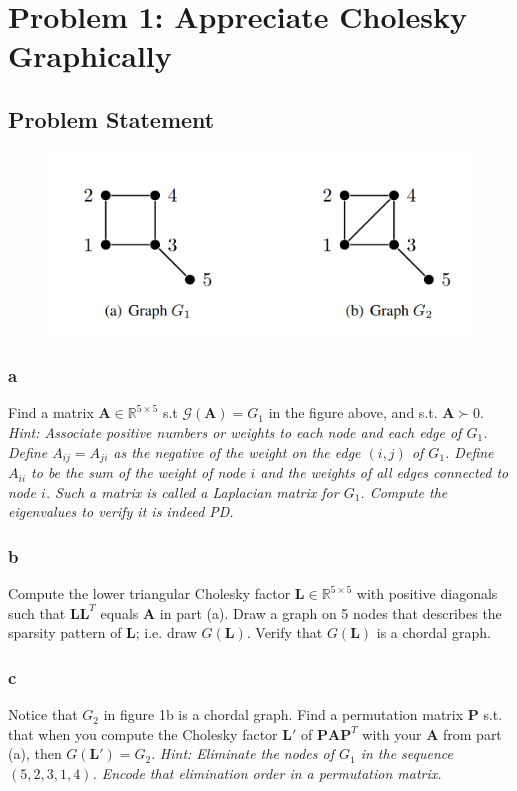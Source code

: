 \documentclass[11pt]{report}
\theoremstyle{definition}
\newcommand{\mat}[1]{\mathbf{#1}}
\begin{document}
\section*{Problem 1: Appreciate Cholesky Graphically}
\subsection*{Problem Statement}
\begin{figure}[h]
	\center
	\includegraphics[width=.8\textwidth]{graph_fig.png}
\end{figure}

\subsubsection*{a}
Find a matrix $\mat{A}\in\mathbb{R}^{5\times5}$ s.t $\mathcal{G}(\mat{A})=G_1$ in the figure
above, and s.t. $\mat{A}\succ0$.
\textit{Hint: Associate positive numbers or weights to each node and each edge
of $G_1$. Define $A_{ij}=A_{ji}$ as the negative of the weight on the edge
$(i,j)$ of $G_1$. Define $A_{ii}$ to be the sum of the weight of node $i$ and the
weights of all edges connected to node $i$. Such a matrix is called a Laplacian
matrix for $G_1$. Compute the eigenvalues to verify it is indeed PD.}

\subsubsection*{b}
Compute the lower triangular Cholesky factor $\mat{L}\in\mathbb{R}^{5\times5}$
with positive diagonals such that $\mat{L}\mat{L}^T$ equals $\mat{A}$ in part
(a). Draw a graph on 5 nodes that describes the sparsity pattern of $\mat{L}$;
i.e. draw $G(\mat{L})$. Verify that $G(\mat{L})$ is a chordal graph.

\subsubsection*{c}
Notice that $G_2$ in figure 1b is a chordal graph. Find a permutation matrix
$\mat{P}$ s.t. that when you compute the Cholesky factor $\mat{L}'$ of
$\mat{PAP}^T$ with your $\mat{A}$ from part (a), then $G(\mat{L}')=G_2$.
\textit{Hint: Eliminate the nodes of $G_1$ in the sequence $(5,2,3,1,4)$. Encode
	that elimination order in a permutation matrix.}
\end{document}
